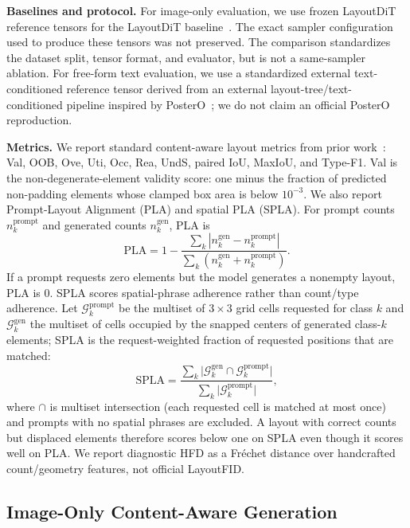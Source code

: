 \documentclass[review]{elsarticle}
\begin{document}
\textbf{Baselines and protocol.}
For image-only evaluation, we use frozen LayoutDiT reference tensors for the LayoutDiT baseline~\cite{Li24}.
The exact sampler configuration used to produce these tensors was not preserved.
The comparison standardizes the dataset split, tensor format, and evaluator, but is not a same-sampler ablation.
For free-form text evaluation, we use a standardized external text-conditioned reference tensor derived from an external layout-tree/text-conditioned pipeline inspired by PosterO~\cite{Hsu25}; we do not claim an official PosterO reproduction.

\textbf{Metrics.}
We report standard content-aware layout metrics from prior work~\cite{Li24}: Val, OOB, Ove, Uti, Occ, Rea, UndS, paired IoU, MaxIoU, and Type-F1.
Val is the non-degenerate-element validity score: one minus the fraction of predicted non-padding elements whose clamped box area is below $10^{-3}$.
We also report Prompt-Layout Alignment (PLA) and spatial PLA (SPLA).
For prompt counts $n_k^{\text{prompt}}$ and generated counts $n_k^{\text{gen}}$, PLA is
\begin{equation}
\text{PLA}=1-\frac{\sum_k |n_k^{\text{gen}}-n_k^{\text{prompt}}|}
{\sum_k(n_k^{\text{gen}}+n_k^{\text{prompt}})}.
\end{equation}
If a prompt requests zero elements but the model generates a nonempty layout, PLA is 0.
SPLA scores spatial-phrase adherence rather than count/type adherence.
Let $\mathcal{G}_k^{\text{prompt}}$ be the multiset of $3{\times}3$ grid cells requested for class $k$ and $\mathcal{G}_k^{\text{gen}}$ the multiset of cells occupied by the snapped centers of generated class-$k$ elements; SPLA is the request-weighted fraction of requested positions that are matched:
\begin{equation}
\text{SPLA}=\frac{\sum_{k}\bigl|\mathcal{G}_k^{\text{gen}}\cap\mathcal{G}_k^{\text{prompt}}\bigr|}{\sum_{k}\bigl|\mathcal{G}_k^{\text{prompt}}\bigr|},
\end{equation}
where $\cap$ is multiset intersection (each requested cell is matched at most once) and prompts with no spatial phrases are excluded.
A layout with correct counts but displaced elements therefore scores below one on SPLA even though it scores well on PLA.
We report diagnostic HFD as a Fr\'echet distance over handcrafted count/geometry features, not official LayoutFID.

\subsection{Image-Only Content-Aware Generation}
\label{sec:image_results}
\end{document}
